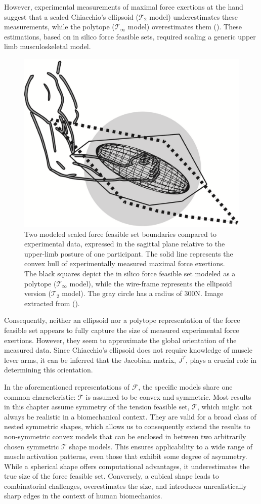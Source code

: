 However, experimental measurements of maximal force exertions at the hand suggest that a scaled Chiacchio's ellipsoid ($\mathcal{T}_2$ model) underestimates these measurements, while the polytope ($\mathcal{T}_{\infty}$ model) overestimates them (\cite{rezzougUpperLimbIsometricForce2021b}). These estimations, based on in silico force feasible sets, required scaling a generic upper limb musculoskeletal model.
\begin{figure}[!htb]
  \captionsetup{justification=centering}
    \centering
    \includegraphics[trim={0 0 0 0}, clip, width=0.5\linewidth]{img/chapter_3/FFSComparisonRezzoug.png}
  \caption{Two modeled scaled force feasible set boundaries compared to experimental data, expressed in the sagittal plane relative to the upper-limb posture of one participant. The solid line represents the convex hull of experimentally measured maximal force exertions. The black squares depict the in silico force feasible set modeled as a polytope ($\mathcal{T}_{\infty}$ model), while the wire-frame represents the ellipsoid version ($\mathcal{T}_2$ model). The gray circle has a radius of 300N. Image extracted from (\cite{rezzougUpperLimbIsometricForce2021b}).}
  \label{fig:rezzoug_exp}
\end{figure}

Consequently, neither an ellipsoid nor a polytope representation of the force feasible set appears to fully capture the size of measured experimental force exertions. However, they seem to approximate the global orientation of the measured data. Since Chiacchio's ellipsoid does not require knowledge of muscle lever arms, it can be inferred that the Jacobian matrix, $J^T$, plays a crucial role in determining this orientation.

In the aforementioned representations of $\mathcal{F}$, the specific models share one common characteristic: $\mathcal{T}$ is assumed to be convex and symmetric. Most results in this chapter assume symmetry of the tension feasible set, $\mathcal{T}$, which might not always be realistic in a biomechanical context. They are valid for a broad class of nested symmetric shapes, which allows us to consequently extend the results to non-symmetric convex models that can be enclosed in between two arbitrarily chosen symmetric $\mathcal{T}$ shape models. This ensures applicability to a wide range of muscle activation patterns, even those that exhibit some degree of asymmetry. While a spherical shape offers computational advantages, it underestimates the true size of the force feasible set. Conversely, a cubical shape leads to combinatorial challenges, overestimates the size, and introduces unrealistically sharp edges in the context of human biomechanics.

